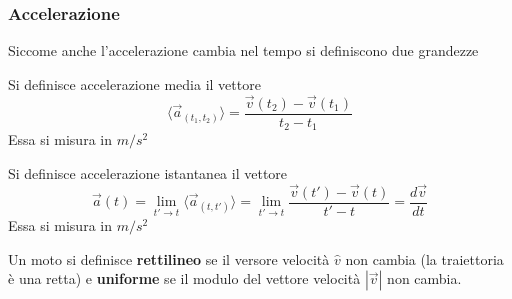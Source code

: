 \documentclass{article}
\theoremstyle{plain}
\begin{document}
\subsubsection{Accelerazione}
Siccome anche l'accelerazione cambia nel tempo si definiscono due grandezze
\begin{boxdef}
    Si definisce accelerazione media il vettore 
    \[\langle\vec{a}_{(t_1,t_2)}\rangle=\frac{\vec{v}(t_2)-\vec{v}(t_1)}{t_2-t_1}\]
    Essa si misura in ${m}/{s^2}$
\end{boxdef}
\begin{boxdef}
    Si definisce accelerazione istantanea il vettore
    \[\vec{a}(t)=\lim_{t'\to t}\langle\vec{a}_{(t,t')}\rangle=\lim_{t'\to t}\frac{\vec{v}(t')-\vec{v}(t)}{t'-t}= \frac{d \vec{v}}{d t}\]
    Essa si misura in ${m}/{s^{2}}$
\end{boxdef}
\begin{boxdef}
    Un moto si definisce \textbf{rettilineo} se il versore velocità $\hat{v}$ non cambia (la traiettoria è una retta) e \textbf{uniforme} se il modulo del vettore velocità $|\vec{v}|$ non cambia.
\end{boxdef}
\end{document}
